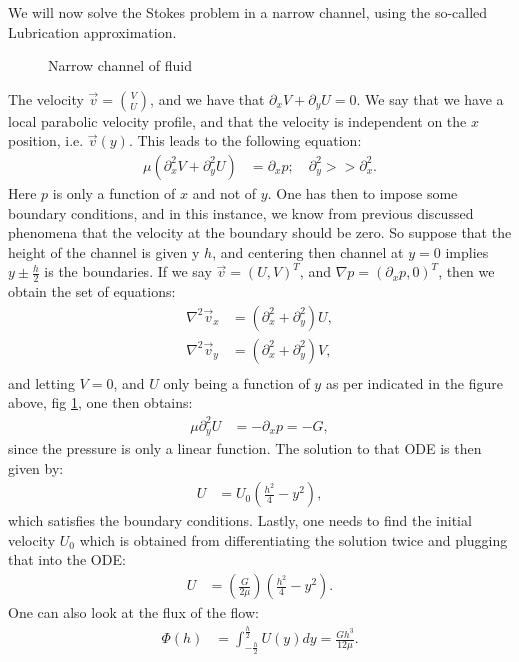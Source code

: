 \documentclass[a4paper]{article}
\begin{document}
\vspace*{.5cm}\noindent
We will now solve the Stokes problem in a narrow channel, using the so-called Lubrication approximation.
\begin{figure}[H]
    \centering
    \caption{Narrow channel of fluid}
    \label{fig: Lubrication approximation}
\end{figure}\noindent
The velocity $\vec{v}=\binom{V}{U}$, and we have that $\partial_x V + \partial_y U = 0$. We say that we have a local parabolic velocity profile, and that the velocity is independent on the $x$ position, i.e. $\vec{v}(y)$.
This leads to the following equation:
\begin{align*}
    \mu\left(\partial_x^2V + \partial_y^2U\right) &= \partial_x p; \quad \partial_y^2 >> \partial_x^2.
\end{align*}Here $p$ is only a function of $x$ and not of $y$. One has then to impose some boundary conditions, and in this instance, we know from previous discussed phenomena that the velocity at the boundary should be zero.
So suppose that the height of the channel is given y $h$, and centering then channel at $y=0$ implies $y \pm \frac{h}{2}$ is the boundaries. If we say $\vec{v} = (U, V)^T$, and $\nabla p = (\partial_x p, 0)^T$, then we obtain the set of equations:
\begin{align*}
    \nabla^2\vec{v}_x &= \left(\partial_x^2 + \partial_y^2\right)U,\\
    \nabla^2\vec{v}_y &= \left(\partial_x^2 + \partial_y^2\right)V,\\
\end{align*}and letting $V = 0$, and $U$ only being a function of $y$ as per indicated in the figure above, fig \ref{fig: Lubrication approximation}, one then obtains:
\begin{align*}
    \mu\partial_y^2U &= -\partial_x p = -G,
\end{align*}since the pressure is only a linear function. The solution to that ODE is then given by:
\begin{align*}
    U &= U_0 \left(\frac{h^2}{4} - y^2\right), 
\end{align*}which satisfies the boundary conditions. Lastly, one needs to find the initial velocity $U_0$ which is obtained from differentiating the solution twice and plugging that into the ODE:
\begin{align*}
    U &= \left(\frac{G}{2\mu}\right)\left(\frac{h^2}{4} - y^2\right).
\end{align*}One can also look at the flux of the flow:
\begin{align*}
    \Phi(h) &= \int_{-\frac{h}{2}}^\frac{h}{2}U(y)dy = \frac{Gh^3}{12\mu}.
\end{align*}
\end{document}
